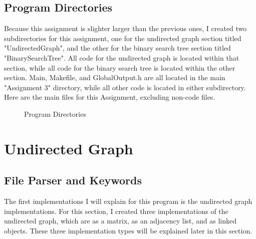 \documentclass[letterpaper, 10pt]{article}
\begin{document}
\vspace{-0.5em}

\subsection{Program Directories}
\vspace{-0.5em}
\noindent
Because this assignment is slighter larger than the previous ones, I created two subdirectories for this assignment, one for the undirected graph section titled "UndirectedGraph", and the other for the binary search tree section titled "BinarySearchTree". All code for the undirected graph is located within that section, while all code for the binary search tree is located within the other section. Main, Makefile, and GlobalOutput.h are all located in the main "Assignment 3" directory, while all other code is located in either subdirectory. Here are the main files for this Assignment, excluding non-code files.

\vspace{-0.5em}

\begin{figure}[H] 
    \centering 
    \caption{Program Directories}
    \label{fig:figure1.3}
\end{figure}

\section{Undirected Graph}
\setcounter{figure}{0} %

\subsection{File Parser and Keywords}
\noindent
The first implementations I will explain for this program is the undirected graph implementations. For this section, I created three implementations of the undirected graph, which are as a matrix, as an adjacency list, and as linked objects. These three implementation types will be explained later in this section. 
\end{document}
